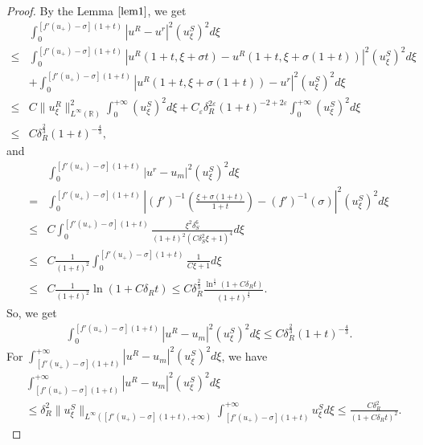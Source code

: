\documentclass[10pt,reqno]{amsart}
\numberwithin{equation}{section}
\begin{document}
\begin{proof}
		By the Lemma $\ref{lem1}$, we get
		\begin{align*}
			&\int_{0}^{[f'(u_{+})-\sigma](1+t)} |u^{R}-u^{r}|^{2}(u_{\xi}^{S})^{2}d\xi\\
			\leq&\int_{0}^{[f'(u_{+})-\sigma](1+t)}|u^{R}(1+t,\xi+\sigma t)-u^{R}(1+t, \xi+\sigma(1+t))|^{2}(u_{\xi}^{S})^{2}d\xi\\
			&+\int_{0}^{[f'(u_{+})-\sigma](1+t)}|u^{R}(1+t, \xi+\sigma(1+t))-u^r|^{2}(u_{\xi}^{S})^{2}d\xi\\
			\leq& C\|u_{\xi}^R\|_{L^{\infty}(\mathbb{R})}^{2} \int_{0}^{+\infty} (u_{\xi}^S)^{2} d\xi + C_{\varepsilon} \delta_{R}^{2\varepsilon} (1+t)^{-2+2\varepsilon} \int_{0}^{+\infty} (u_{\xi}^S)^{2} d\xi\\
			\leq& C \delta_{R}^{\frac{2}{3}} (1+t)^{-\frac{4}{3}},
		\end{align*}
		and
		\begin{equation*}
			\begin{aligned}
				&\int_{0}^{[f'(u_{+})-\sigma](1+t)}|u^{r}-u_{m}|^{2}(u_{\xi}^{S})^{2}d\xi\\
				=&\int_{0}^{[f'(u_{+})-\sigma](1+t)}\left|(f')^{-1}\left(\frac{\xi+\sigma(1+t)}{1+t}\right)-(f')^{-1}(\sigma)\right|^{2}(u_{\xi}^{S})^{2}d\xi\\
				\leq& C\int_{0}^{[f'(u_{+})-\sigma](1+t)}\frac{\xi^{2}\delta_{S}^{6}}{(1+t)^{2}(C\delta_{S}^{2}\xi+1)^{4}}d\xi\\
				\leq& C\frac{1}{(1+t)^{2}}\int_{0}^{[f'(u_{+})-\sigma](1+t)}\frac{1}{C\xi+1}d\xi\\
				\leq& C\frac{1}{(1+t)^{2}}\ln(1+C\delta_{R}t)\leq C\delta_R^{\frac{2}{3}}\frac{\ln^{\frac{1}{3}}(1+C\delta_{R}t)}{(1+t)^{\frac{4}{3}}}.
			\end{aligned}
		\end{equation*}
		So, we get
		\begin{align*}
			\int_{0}^{[f'(u_{+})-\sigma](1+t)} |u^{R}-u_{m}|^{2}(u_{\xi}^{S})^{2}d\xi\leq C \delta_{R}^{\frac{2}{3}} (1+t)^{-\frac{4}{3}}.
		\end{align*}
		For $\int_{[f'(u_{+})-\sigma](1+t)}^{+\infty} |u^{R}-u_{m}|^{2} (u_{\xi}^{S})^{2} d\xi$, we have
		\begin{align*}
			&\int_{[f'(u_{+})-\sigma](1+t)}^{+\infty} |u^{R}-u_{m}|^{2} (u_{\xi}^{S})^{2} d\xi \\
			&\leq \delta_{R}^{2} \|u_{\xi}^{S}\|_{L^{\infty}([f'(u_{+})-\sigma](1+t), +\infty)} \int_{[f'(u_{+})-\sigma](1+t)}^{+\infty} u_{\xi}^{S} d\xi
			\leq  \frac{C\delta_{R}^{2}}{(1+C\delta_{R}t)^{2}}.
		\end{align*} 

\end{proof}
\end{document}
